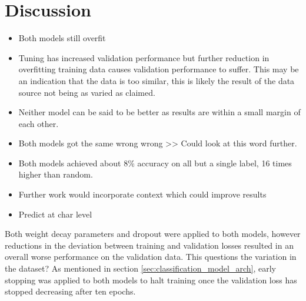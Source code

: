 \section{Discussion}
\begin{itemize}
   \item Both models still overfit 
   \item Tuning has increased validation performance but further reduction in overfitting training data causes validation performance to suffer.
   This may be an indication that the data is too similar, this is likely the result of the data source not being as varied as claimed.
   \item Neither model can be said to be better as results are within a small margin of each other. 
   \item Both models got the same wrong wrong >> Could look at this word further.
   \item Both models achieved about 8\% accuracy on all but a single label, 16 times higher than random.
   \item Further work would incorporate context which could improve results
   \item Predict at char level
\end{itemize}
Both weight decay parameters and dropout were applied to both models, however reductions in the deviation between training and validation losses resulted in an overall worse performance on the validation data.
This questions the variation in the dataset?
As mentioned in section \ref{sec:classification_model_arch}, early stopping was applied to both models to halt training once the validation loss has stopped decreasing after ten epochs.

%
%
%